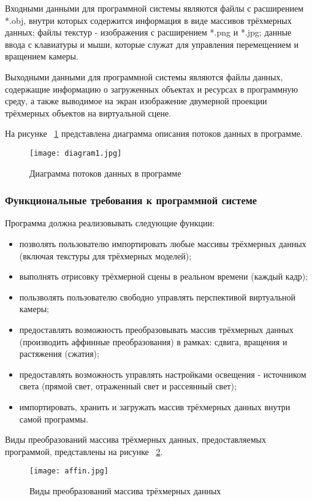 Входными данными для программной системы являются файлы с расширением *.obj, внутри которых содержится информация в виде массивов трёхмерных данных; файлы текстур - изображения с расширением *.png и *.jpg; данные ввода с клавиатуры и мыши, которые служат для управления перемещением и вращением камеры.

Выходными данными для программной системы являются файлы данных, содержащие информацию о загруженных объектах и ресурсах в программную среду, а также выводимое на экран изображение двумерной проекции трёхмерных объектов на виртуальной сцене.

На рисунке ~\ref{diagram1:image} представлена диаграмма описания потоков данных в программе.

\begin{figure}[ht]
	\texttt{[image: diagram1.jpg]}
	\caption{Диаграмма потоков данных в программе}
	\label{diagram1:image}
\end{figure}

\subsubsection{Функциональные требования к программной системе}

Программа должна реализовывать следующие функции:
\begin{itemize}
    \item позволять пользователю импортировать любые массивы трёхмерных данных (включая текстуры для трёхмерных моделей);
    \item выполнять отрисовку трёхмерной сцены в реальном времени (каждый кадр);
    \item пользволять пользователю свободно управлять перспективой виртуальной камеры;
    \item предоставлять возможность преобразовывать массив трёхмерных данных (производить аффинные преобразования) в рамках: сдвига, вращения и растяжения (сжатия);
    \item предоставлять возможность управлять настройками освещения - источником света (прямой свет, отраженный свет и рассеянный свет);
    \item импортировать, хранить и загружать массив трёхмерных данных внутри самой программы.
\end{itemize}

Виды преобразований массива трёхмерных данных, предоставляемых программой, представлены на рисунке ~\ref{affin:image}.

\begin{figure}[ht]
\texttt{[image: affin.jpg]}
\caption{Виды преобразований массива трёхмерных данных}
\label{affin:image}
\end{figure}

